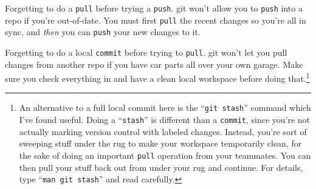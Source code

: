 \begin{compactitem} \item Forgetting to do a \texttt{pull} before trying a
\texttt{push}. git won't allow you to \texttt{push} into a repo if you're
out-of-date. You must first \texttt{pull} the recent changes so you're all in
sync, and \textit{then} you can \texttt{push} your new changes to it. \item
Forgetting to do a local \texttt{commit} before trying to \texttt{pull}. git
won't let you pull changes from another repo if you have car parts all over
your own garage. Make sure you check everything in and have a clean local
workspace before doing that.\footnote{An alternative to a full local commit
here is the ``\texttt{git stash}'' command which I've found useful. Doing a
``\texttt{stash}'' is different than a \texttt{commit}, since you're not
actually marking version control with labeled changes. Instead, you're sort of
sweeping stuff under the rug to make your workspace temporarily clean, for the
sake of doing an important \texttt{pull} operation from your teammates. You
can then pull your stuff back out from under your rug and continue. For
details, type ``\texttt{man git stash}'' and read carefully.}

\end{compactitem}


